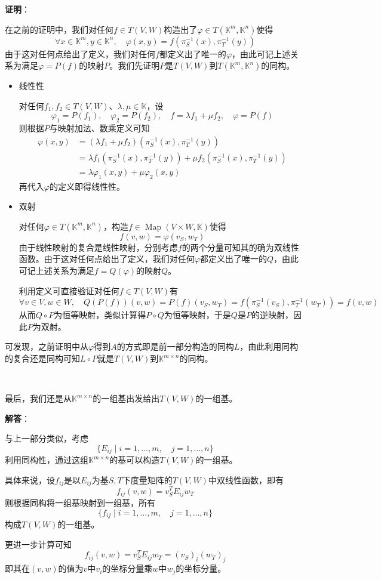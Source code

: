 \documentclass[a4paper,UTF8,fontset=windows,AutoFakeBold]{ctexart}
\DeclareMathOperator{\Map}{Map}
\newcommand{\proo}[1]{{\vspace{5pt}\kaishu\noindent\textbf{证明}：\vspace{-3pt}
\begin{compactitem}
    \item[] #1
\end{compactitem}
}}
\newcommand{\sol}[1]{{\vspace{5pt}\kaishu\noindent\textbf{解答}：\vspace{-3pt}
\begin{compactitem}
    \item[] #1
\end{compactitem}
}}
\begin{document}
\proo{
    在之前的证明中，我们对任何$f\in T(V,W)$构造出了$\varphi\in T(\mathbb{K}^m,\mathbb{K}^n)$使得
    $$\forall x\in\mathbb{K}^m,y\in\mathbb{K}^n,\quad\varphi(x,y)=f(\pi_S^{-1}(x),\pi_T^{-1}(y))$$
    由于这对任何点给出了定义，我们对任何$f$都定义出了唯一的$\varphi$，由此可记上述关系为满足$\varphi=P(f)$的映射$P$。我们先证明$P$是$T(V,W)$到$T(\mathbb{K}^m,\mathbb{K}^n)$的同构。

    \begin{itemize}
        \item 线性性

        对任何$f_1,f_2\in T(V,W)$、$\lambda,\mu\in\mathbb{K}$，设
        $$\varphi_1=P(f_1),\quad\varphi_2=P(f_2),\quad f=\lambda f_1+\mu f_2,\quad\varphi=P(f)$$
        则根据$P$与映射加法、数乘定义可知
        $$\begin{aligned}\varphi(x,y)&=(\lambda f_1+\mu f_2)(\pi_S^{-1}(x),\pi_T^{-1}(y))\\ &=\lambda f_1(\pi_S^{-1}(x),\pi_T^{-1}(y))+\mu f_2(\pi_S^{-1}(x),\pi_T^{-1}(y))\\ &=\lambda\varphi_1(x,y)+\mu\varphi_2(x,y)\end{aligned}$$
        再代入$\varphi$的定义即得线性性。

        \item 双射

        对任何$\varphi\in T(\mathbb{K}^m,\mathbb{K}^n)$，构造$f\in\Map(V\times W,\mathbb{K})$使得
        $$f(v,w)=\varphi(v_S,w_T)$$
        由于线性映射的复合是线性映射，分别考虑$f$的两个分量可知其的确为双线性函数。由于这对任何点给出了定义，我们对任何$\varphi$都定义出了唯一的$Q$，由此可记上述关系为满足$f=Q(\varphi)$的映射$Q$。

        利用定义可直接验证对任何$f\in T(V,W)$有
        $$\forall v\in V,w\in W,\quad Q(P(f))(v,w)=P(f)(v_S,w_T)=f(\pi_S^{-1}(v_S),\pi_T^{-1}(w_T))=f(v,w)$$
        从而$Q\circ P$为恒等映射，类似计算得$P\circ Q$为恒等映射，于是$Q$是$P$的逆映射，因此$P$为双射。
    \end{itemize}

    可发现，之前证明中从$\varphi$得到$A$的方式即是前一部分构造的同构$L$，由此利用同构的复合还是同构可知$L\circ P$就是$T(V,W)$到$\mathbb{K}^{m\times n}$的同构。
}

\

最后，我们还是从$\mathbb{K}^{m\times n}$的一组基出发给出$T(V,W)$的一组基。

\sol{
    与上一部分类似，考虑
    $$\{E_{ij}\mid i=1,\dots,m,\quad j=1,\dots,n\}$$
    利用同构性，通过这组$\mathbb{K}^{m\times n}$的基可以构造$T(V,W)$的一组基。

    具体来说，设$f_{ij}$是以$E_{ij}$为基$S,T$下度量矩阵的$T(V,W)$中双线性函数，即有
    $$f_{ij}(v,w)=v_S^TE_{ij}w_T$$
    则根据同构将一组基映射到一组基，所有
    $$\{f_{ij}\mid i=1,\dots,m,\quad j=1,\dots,n\}$$
    构成$T(V,W)$的一组基。

    更进一步计算可知
    $$f_{ij}(v,w)=v_S^TE_{ij}w_T=(v_S)_i(w_T)_j$$
    即其在$(v,w)$的值为$v$中$v_i$的坐标分量乘$w$中$w_j$的坐标分量。
}
\end{document}
